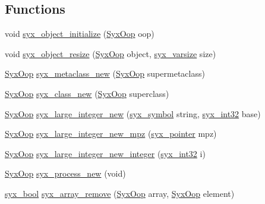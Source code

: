 \subsection*{Functions}
\begin{CompactItemize}
\item 
void \hyperlink{syx-object_8c_9ae6644e857a7db2d3ddbbf45d746739}{syx\_\-object\_\-initialize} (\hyperlink{syx-types_8h_1121caba2d40b2ce090b640762744ccd}{SyxOop} oop)
\item 
void \hyperlink{syx-object_8c_c164e22639b461973d79531c6bf62a4e}{syx\_\-object\_\-resize} (\hyperlink{syx-types_8h_1121caba2d40b2ce090b640762744ccd}{SyxOop} object, \hyperlink{syx-types_8h_18e1a1417591a1efb670b97ce320f535}{syx\_\-varsize} size)
\item 
\hyperlink{syx-types_8h_1121caba2d40b2ce090b640762744ccd}{SyxOop} \hyperlink{syx-object_8c_0624244f32f755ddc9c08d20672874a4}{syx\_\-metaclass\_\-new} (\hyperlink{syx-types_8h_1121caba2d40b2ce090b640762744ccd}{SyxOop} supermetaclass)
\item 
\hyperlink{syx-types_8h_1121caba2d40b2ce090b640762744ccd}{SyxOop} \hyperlink{syx-object_8c_6067196d3fd562cb85f54784232b604a}{syx\_\-class\_\-new} (\hyperlink{syx-types_8h_1121caba2d40b2ce090b640762744ccd}{SyxOop} superclass)
\item 
\hyperlink{syx-types_8h_1121caba2d40b2ce090b640762744ccd}{SyxOop} \hyperlink{syx-object_8c_a47aa6d16449ab82178626704b81aaf4}{syx\_\-large\_\-integer\_\-new} (\hyperlink{syx-types_8h_9663af54b7b72f5d8be5f754ef356525}{syx\_\-symbol} string, \hyperlink{syx-types_8h_9f31c17555a2dfcf25da84b5c4a2e55b}{syx\_\-int32} base)
\item 
\hyperlink{syx-types_8h_1121caba2d40b2ce090b640762744ccd}{SyxOop} \hyperlink{syx-object_8c_4c020d3a248873725c51ee27b0e4d133}{syx\_\-large\_\-integer\_\-new\_\-mpz} (\hyperlink{syx-types_8h_51c518ab1f082eb4330ca143afb1584f}{syx\_\-pointer} mpz)
\item 
\hyperlink{syx-types_8h_1121caba2d40b2ce090b640762744ccd}{SyxOop} \hyperlink{syx-object_8c_2df18ddb02364c9f0b6d2ed4533ab4c5}{syx\_\-large\_\-integer\_\-new\_\-integer} (\hyperlink{syx-types_8h_9f31c17555a2dfcf25da84b5c4a2e55b}{syx\_\-int32} i)
\item 
\hyperlink{syx-types_8h_1121caba2d40b2ce090b640762744ccd}{SyxOop} \hyperlink{syx-object_8c_f6ad7102f21107a9f0de770ff84e1165}{syx\_\-process\_\-new} (void)
\item 
\hyperlink{syx-types_8h_c6dc09b276b99fa1956364359139daab}{syx\_\-bool} \hyperlink{syx-object_8c_2e1d56f1b3a60304028b5b3267eea2ac}{syx\_\-array\_\-remove} (\hyperlink{syx-types_8h_1121caba2d40b2ce090b640762744ccd}{SyxOop} array, \hyperlink{syx-types_8h_1121caba2d40b2ce090b640762744ccd}{SyxOop} element)

\end{CompactItemize}
